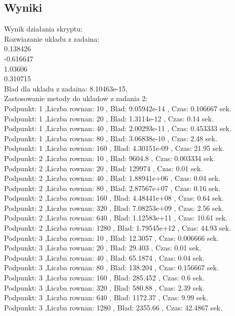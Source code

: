 \documentclass[a4paper, 11pt]{article}
\begin{document}
\subsection{Wyniki}
Wynik działania skryptu:\\
Rozwiazanie ukladu z zadaina:\\
0.138426\\
-0.616647\\
1.03606\\
0.310715\\
Blad dla ukladu z zadaina: 8.10463e-15,\\
Zastosowanie metody do ukladow z zadania 2:\\
Podpunkt: 1 ,Liczba rownan: 10 , Blad: 9.05942e-14 , Czas: 0.106667 sek.\\
Podpunkt: 1 ,Liczba rownan: 20 , Blad: 1.3114e-12 , Czas: 0.14 sek.\\
Podpunkt: 1 ,Liczba rownan: 40 , Blad: 2.00293e-11 , Czas: 0.453333 sek.\\
Podpunkt: 1 ,Liczba rownan: 80 , Blad: 3.06838e-10 , Czas: 2.48 sek.\\
Podpunkt: 1 ,Liczba rownan: 160 , Blad: 4.30151e-09 , Czas: 21.95 sek.\\
Podpunkt: 2 ,Liczba rownan: 10 , Blad: 9604.8 , Czas: 0.003334 sek.\\
Podpunkt: 2 ,Liczba rownan: 20 , Blad: 129974 , Czas: 0.01 sek.\\
Podpunkt: 2 ,Liczba rownan: 40 , Blad: 1.88941e+06 , Czas: 0.04 sek.\\
Podpunkt: 2 ,Liczba rownan: 80 , Blad: 2.87567e+07 , Czas: 0.16 sek.\\
Podpunkt: 2 ,Liczba rownan: 160 , Blad: 4.48441e+08 , Czas: 0.64 sek.\\
Podpunkt: 2 ,Liczba rownan: 320 , Blad: 7.08253e+09 , Czas: 2.56 sek.\\
Podpunkt: 2 ,Liczba rownan: 640 , Blad: 1.12583e+11 , Czas: 10.61 sek.\\
Podpunkt: 2 ,Liczba rownan: 1280 , Blad: 1.79545e+12 , Czas: 44.93 sek.\\
Podpunkt: 3 ,Liczba rownan: 10 , Blad: 12.3057 , Czas: 0.006666 sek.\\
Podpunkt: 3 ,Liczba rownan: 20 , Blad: 29.403 , Czas: 0.01 sek.\\
Podpunkt: 3 ,Liczba rownan: 40 , Blad: 65.1874 , Czas: 0.04 sek.\\
Podpunkt: 3 ,Liczba rownan: 80 , Blad: 138.204 , Czas: 0.156667 sek.\\
Podpunkt: 3 ,Liczba rownan: 160 , Blad: 285.452 , Czas: 0.6 sek.\\
Podpunkt: 3 ,Liczba rownan: 320 , Blad: 580.88 , Czas: 2.39 sek.\\
Podpunkt: 3 ,Liczba rownan: 640 , Blad: 1172.37 , Czas: 9.99 sek.\\
Podpunkt: 3 ,Liczba rownan: 1280 , Blad: 2355.66 , Czas: 42.4867 sek.\\
\end{document}
